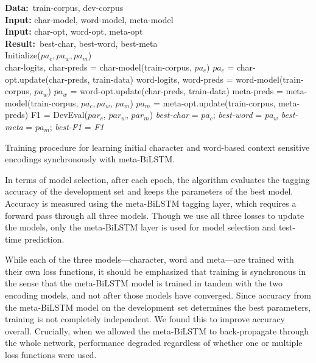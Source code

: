 \documentclass[11pt,a4paper]{article}
\begin{document}
\begin{algorithm}[ht!]
\small
\SetNoFillComment
\newcommand{\var}[1]{\textit{#1}}
\newcommand{\kw}[1]{\textbf{#1}}
\newcommand\mycommfont[1]{\footnotesize\ttfamily{#1}}
 \kw{Data:}~{train-corpus, dev-corpus}\\
 \textbf{Input:} char-model, word-model, meta-model\\
 \textbf{Input:} char-opt, word-opt, meta-opt \\
 \kw{Result:}~{best-char, best-word, best-meta}\\
 Initialize($pa_c, pa_w, pa_m$)\\
 \For{epoch = 1 \kw{to} MAX}  { 
   char-logits, char-preds =  char-model(train-corpus, $pa_c$)
   $pa_c$ = char-opt.update(char-preds, train-data)
   word-logits, word-preds =  word-model(train-corpus, $pa_w$)
   $pa_w$ = word-opt.update(char-preds, train-data)
   meta-preds = meta-model(train-corpus, $pa_c, pa_w$, $pa_m$)
   $pa_m$ = meta-opt.update(train-corpus, meta-preds)
  F1 = DevEval($par_c$, $par_w$, $par_m$)
   {
    \var{best-char} = $pa_c$; \var{best-word} = $pa_w$ 
    \var{best-meta} = $pa_m$; \var{best-F1} = \var{F1}
  }
}
 
 \caption{Training procedure for learning initial character and word-based context sensitive encodings synchronously with meta-BiLSTM.}
 \label{alg:training}
\end{algorithm}

In terms of model selection, after each epoch, the algorithm evaluates the tagging accuracy of the development set and keeps the parameters of the best model. Accuracy is measured using the meta-BiLSTM tagging layer, which requires a forward pass through all three models. Though we use all three losses to update the models, only the meta-BiLSTM layer is used for model selection and test-time prediction.

While each of the three models---character, word and meta---are trained with their own loss functions, it should be emphasized that training is synchronous in the sense that the meta-BiLSTM model is trained in tandem with the two encoding models, and not after those models have converged. Since accuracy from the meta-BiLSTM model on the development set determines the best parameters, training is not completely independent. We found this to improve accuracy overall. Crucially, when we allowed the meta-BiLSTM to back-propagate through the whole network, performance degraded regardless of whether one or multiple loss functions were used.
\end{document}
